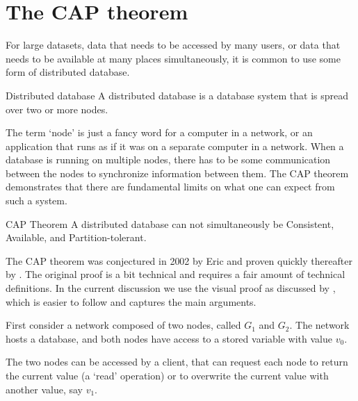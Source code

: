 \section{The CAP theorem}
\label{sect:relational:cap}
For large datasets, data that needs to be accessed by many users, or data that
needs to be available at many places simultaneously, it is common to use some
form of distributed database. 
\begin{terminology}{Distributed database}
A distributed database is a database system that is spread over two
or more nodes.
\end{terminology}
%
The term `node' is just a fancy word for a computer in a network, or an
application that runs as if it was on a separate computer in a network. When a
database is running on multiple nodes, there has to be some communication
between the nodes to synchronize information between them. The CAP theorem
demonstrates that there are fundamental limits on what one can expect from such
a system.
%
\begin{terminology}{CAP Theorem}
A distributed database can not simultaneously be Consistent, Available, and
Partition-tolerant.
\end{terminology}
The CAP theorem was conjectured in 2002 by Eric \citet{brewer2002towards} and
proven quickly thereafter by \citet{gilbert2002brewer}.  The original proof is
a bit technical and requires a fair amount of technical definitions.  In the
current discussion we use the visual proof as discussed by
,
which is easier to follow and captures the main arguments.


First consider a network composed of two nodes, called $G_1$ and $G_2$. The
network hosts a database, and both nodes have access to a stored variable with
value $v_0$.
%
\begin{center}
\end{center}
%
The two nodes can be accessed by a client, that can request each node to return
the current value (a `read' operation) or to overwrite the current value with
another value, say $v_1$.

